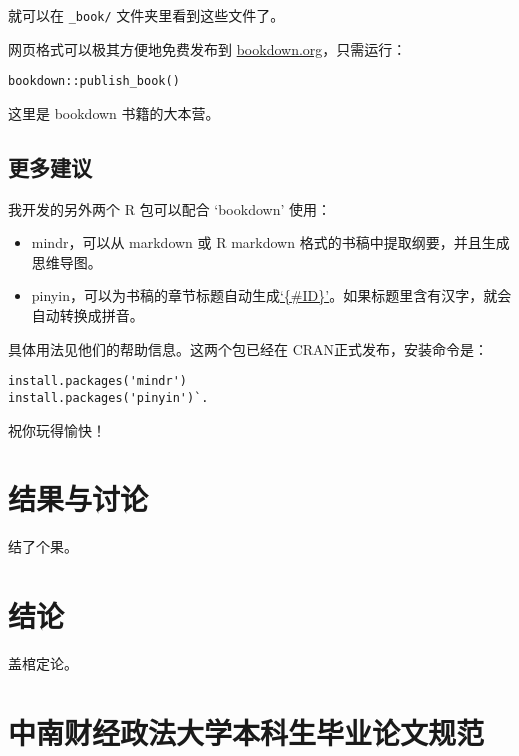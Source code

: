 \documentclass[singlesided]{Style/ucasthesis}%
\begin{document}
就可以在 \texttt{\_book/} 文件夹里看到这些文件了。

网页格式可以极其方便地免费发布到 \href{https://bookdown.org}{bookdown.org}，只需运行：

\begin{verbatim}
bookdown::publish_book()
\end{verbatim}

这里是 bookdown 书籍的大本营。

\hypertarget{section-8}{%
\section{更多建议}\label{section-8}}

我开发的另外两个 R 包可以配合 `bookdown' 使用：

\begin{itemize}
\item
  mindr，可以从 markdown 或 R markdown 格式的书稿中提取纲要，并且生成思维导图。
\item
  pinyin，可以为书稿的章节标题自动生成\href{https://bookdown.org/yihui/bookdown/cross-references.html}{`\{\#ID\}'}。如果标题里含有汉字，就会自动转换成拼音。
\end{itemize}

具体用法见他们的帮助信息。这两个包已经在 CRAN正式发布，安装命令是：

\begin{verbatim}
install.packages('mindr')
install.packages('pinyin')`.
\end{verbatim}

祝你玩得愉快！

\hypertarget{results}{%
\chapter{结果与讨论}\label{results}}

结了个果。

\hypertarget{conclusion}{%
\chapter{结论}\label{conclusion}}

盖棺定论。

\appendix

\hypertarget{section-9}{%
\chapter{中南财经政法大学本科生毕业论文规范}\label{section-9}}
\end{document}
